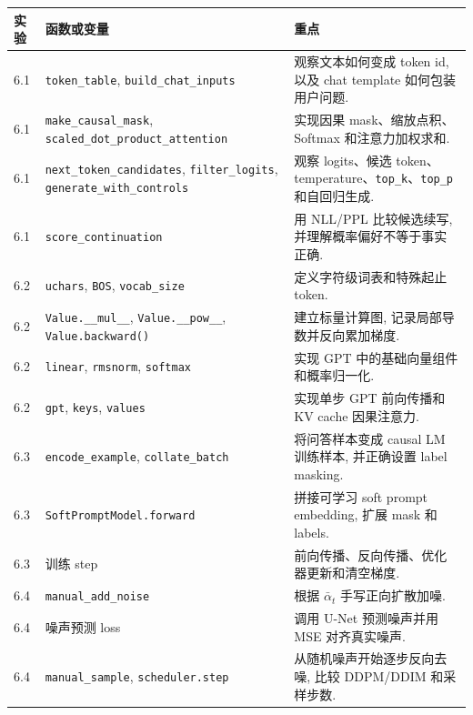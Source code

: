 \documentclass{../../nndlcourse}
\begin{document}
\begin{center}
\small
\begin{tabular}{|p{2.0cm}|p{5.8cm}|p{5.0cm}|}
\hline
\textbf{实验} & \textbf{函数或变量} & \textbf{重点} \\
\hline
6.1 & \texttt{token\_table}, \texttt{build\_chat\_inputs} & 观察文本如何变成 token id, 以及 chat template 如何包装用户问题. \\
\hline
6.1 & \texttt{make\_causal\_mask}, \texttt{scaled\_dot\_product\_attention} & 实现因果 mask、缩放点积、Softmax 和注意力加权求和. \\
\hline
6.1 & \texttt{next\_token\_candidates}, \texttt{filter\_logits}, \texttt{generate\_with\_controls} & 观察 logits、候选 token、temperature、\texttt{top\_k}、\texttt{top\_p} 和自回归生成. \\
\hline
6.1 & \texttt{score\_continuation} & 用 NLL/PPL 比较候选续写, 并理解概率偏好不等于事实正确. \\
\hline
6.2 & \texttt{uchars}, \texttt{BOS}, \texttt{vocab\_size} & 定义字符级词表和特殊起止 token. \\
\hline
6.2 & \texttt{Value.\_\_mul\_\_}, \texttt{Value.\_\_pow\_\_}, \texttt{Value.backward()} & 建立标量计算图, 记录局部导数并反向累加梯度. \\
\hline
6.2 & \texttt{linear}, \texttt{rmsnorm}, \texttt{softmax} & 实现 GPT 中的基础向量组件和概率归一化. \\
\hline
6.2 & \texttt{gpt}, \texttt{keys}, \texttt{values} & 实现单步 GPT 前向传播和 KV cache 因果注意力. \\
\hline
6.3 & \texttt{encode\_example}, \texttt{collate\_batch} & 将问答样本变成 causal LM 训练样本, 并正确设置 label masking. \\
\hline
6.3 & \texttt{SoftPromptModel.forward} & 拼接可学习 soft prompt embedding, 扩展 mask 和 labels. \\
\hline
6.3 & 训练 step & 前向传播、反向传播、优化器更新和清空梯度. \\
\hline
6.4 & \texttt{manual\_add\_noise} & 根据 $\bar{\alpha}_t$ 手写正向扩散加噪. \\
\hline
6.4 & 噪声预测 loss & 调用 U-Net 预测噪声并用 MSE 对齐真实噪声. \\
\hline
6.4 & \texttt{manual\_sample}, \texttt{scheduler.step} & 从随机噪声开始逐步反向去噪, 比较 DDPM/DDIM 和采样步数. \\
\hline
\end{tabular}
\end{center}


\end{document}

